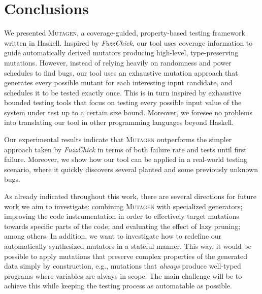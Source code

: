 \documentclass[acmsmall, anonymous]{acmart}
\newcommand{\fuzzchick}{\textit{FuzzChick}\xspace}
\newcommand{\mutagen}{\textsc{Mutagen}\xspace}
\begin{document}

\section{Conclusions}
\label{sec:conclusions}

We presented \mutagen, a coverage-guided, property-based testing framework
written in Haskell.
%
Inspired by \fuzzchick, our tool uses coverage information to guide
automatically derived mutators producing high-level, type-preserving mutations.
%
However, instead of relying heavily on randomness and power schedules to find
bugs, our tool uses an exhaustive mutation approach that generates every
possible mutant for each interesting input candidate, and schedules it to be
tested exactly once.
%
This is in turn inspired by exhaustive bounded testing tools that focus on
testing every possible input value of the system under test up to a certain size
bound.
%
Moreover, we foresee no problems into translating our tool in other programming
languages beyond Haskell.



Our experimental results indicate that \mutagen outperforms the simpler approach
taken by \fuzzchick in terms of both failure rate and tests until first failure.
%
Moreover, we show how our tool can be applied in a real-world testing scenario,
where it quickly discovers several planted and some previously unknown bugs.


As already indicated throughout this work, there are several directions for
future work we aim to investigate:
%
combining \mutagen with specialized generators; improving the code
instrumentation in order to effectively target mutations towards specific parts
of the code; and evaluating the effect of lazy pruning; among others.
%
In addition, we want to investigate how to redefine our automatically
synthesized mutators in a stateful manner.
%
This way, it would be possible to apply mutations that preserve complex
properties of the generated data simply by construction, e.g., mutations that
\emph{always} produce well-typed programs where variables are always in scope.
%
The main challenge will be to achieve this while keeping the testing process as
automatable as possible.



\end{document}
